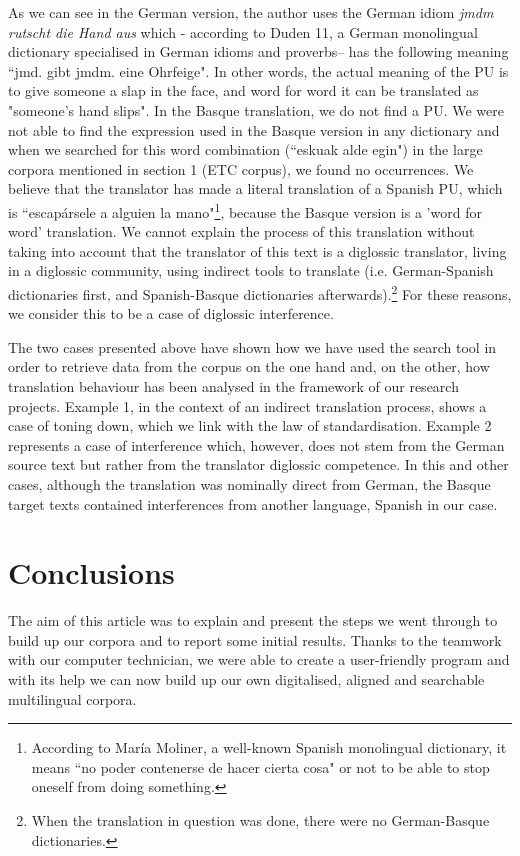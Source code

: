 \documentclass[output=paper]{LSP/langsci}
\begin{document}
As we can see in the German version, the author uses the German idiom \textit{jmdm rutscht die Hand aus} which - according to Duden 11, a German monolingual dictionary specialised in German idioms and proverbs– has the following meaning “jmd. gibt jmdm. eine Ohrfeige". In other words, the actual meaning of the PU is to give someone a slap in the face, and word for word it can be translated as "someone's hand slips". In the Basque translation, we do not find a PU. We were not able to find the expression used in the Basque version in any dictionary and when we searched for this word combination (“eskuak alde egin") in the large corpora mentioned in section 1 (ETC corpus), we found no occurrences. We believe that the translator has made a literal translation of a Spanish PU, which is “escapársele a alguien la mano"\footnote{According to María Moliner, a well-known Spanish monolingual dictionary, it means “no poder contenerse de hacer cierta cosa" or not to be able to stop oneself from doing something.}, because the Basque version is a 'word for word' translation. We cannot explain the process of this translation without taking into account that the translator of this text is a diglossic translator, living in a diglossic community, using indirect tools to translate (i.e. German-Spanish dictionaries first, and Spanish-Basque dictionaries afterwards).\footnote{When the translation in question was done, there were no German-Basque dictionaries.} For these reasons, we consider this to be a case of diglossic interference.

The two cases presented above have shown how we have used the search tool in order to retrieve data from the corpus on the one hand and, on the other, how translation behaviour has been analysed in the framework of our research projects. Example 1, in the context of an indirect translation process, shows a case of toning down, which we link with the law of standardisation. Example 2 represents a case of interference which, however, does not stem from the German source text but rather from the translator diglossic competence. In this and other cases, although the translation was nominally direct from German, the Basque target texts contained interferences from another language, Spanish in our case.

\section{Conclusions}

The aim of this article was to explain and present the steps we went through to build up our corpora and to report some initial results. Thanks to the teamwork with our computer technician, we were able to create a user-friendly program and with its help we can now build up our own digitalised, aligned and searchable multilingual corpora.
\end{document}
